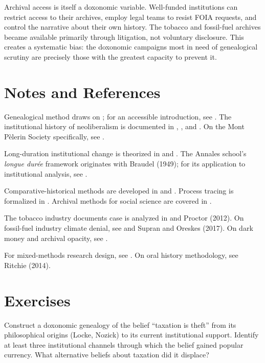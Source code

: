 Archival access is itself a doxonomic variable.
Well-funded institutions can restrict access to their archives, employ legal teams to resist FOIA requests, and control the narrative about their own history.
The tobacco and fossil-fuel archives became available primarily through litigation, not voluntary disclosure.
This creates a systematic bias: the doxonomic campaigns most in need of genealogical scrutiny are precisely those with the greatest capacity to prevent it.

\section{Notes and References}
\label{sec:ch18-notes}

Genealogical method draws on \textcite{foucault1971}; for an accessible introduction, see \textcite{gutting2005}.
The institutional history of neoliberalism is documented in \textcite{mirowski2009}, \textcite{harvey2005}, and \textcite{phillipsfein2009}.
On the Mont P\`{e}lerin Society specifically, see \textcite{slobodian2018}.

Long-duration institutional change is theorized in \textcite{north1990} and \textcite{acemoglu2012}.
The Annales school's \emph{longue dur\'{e}e} framework originates with Braudel (1949); for its application to institutional analysis, see \textcite{pierson2004}.

Comparative-historical methods are developed in \textcite{mahoney2003} and \textcite{skocpol1979}.
Process tracing is formalized in \textcite{bennett2015}.
Archival methods for social science are covered in \textcite{king1994}.

The tobacco industry documents case is analyzed in \textcite{oreskes2010} and Proctor (2012).
On fossil-fuel industry climate denial, see \textcite{oreskes2010} and Supran and Oreskes (2017).
On dark money and archival opacity, see \textcite{mayer2016}.

For mixed-methods research design, see \textcite{creswell2017}.
On oral history methodology, see Ritchie (2014).

\section{Exercises}

\begin{exercise}
Construct a doxonomic genealogy of the belief ``taxation is theft'' from its philosophical origins (Locke, Nozick) to its current institutional support.
Identify at least three institutional channels through which the belief gained popular currency.
What alternative beliefs about taxation did it displace?
\end{exercise}

